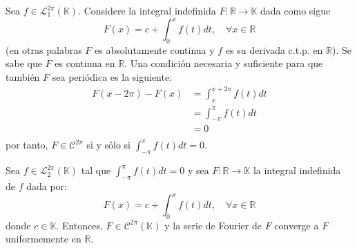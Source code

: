 \documentclass[12pt]{report}
\theoremstyle{largebreak}
\newcommand\cf[3]{\ensuremath{#1:#2\rightarrow#3}}
\begin{document}
    \begin{obs}
        Sea $f\in\mathcal{L}_1^{2\pi}(\mathbb{K})$. Considere la integral indefinida $\cf{F}{\mathbb{R}}{\mathbb{K}}$ dada como sigue
        \begin{equation*}
            F(x)=c+\int_0^xf(t)dt,\quad\forall x\in\mathbb{R}
        \end{equation*}
        (en otras palabras $F$ es absolutamente continua y $f$ es su derivada c.t.p. en $\mathbb{R}$). Se sabe que $F$ es continua en $\mathbb{R}$. Una condición necesaria y suficiente para que también $F$ sea periódica es la siguiente:
        \begin{equation*}
            \begin{split}
                F(x-2\pi)-F(x)&=\int_x^{ x+2\pi}f(t)dt\\
                &=\int_{-\pi}^{\pi}f(t)dt\\
                &=0\\
            \end{split}
        \end{equation*}
        por tanto, $F\in\mathcal{C}^{2\pi}$ si y sólo si $\int_{-\pi}^\pi f(t)dt=0$.
    \end{obs}

    \begin{theor}
        Sea $f\in\mathcal{L}_2^{2\pi}(\mathbb{K})$ tal que $\int_{-\pi}^\pi f(t)dt=0$ y sea $\cf{F}{\mathbb{R}}{\mathbb{K}}$ la integral indefinida de $f$ dada por:
        \begin{equation*}
            F(x)=c+\int_{ 0}^xf(t)dt,\quad\forall x\in\mathbb{R}
        \end{equation*}
        donde $c\in\mathbb{K}$. Entonces, $F\in\mathcal{C}^{2\pi}(\mathbb{K})$ y la serie de Fourier de $F$ converge a $F$ uniformemente en $\mathbb{R}$.
    \end{theor}
\end{document}
